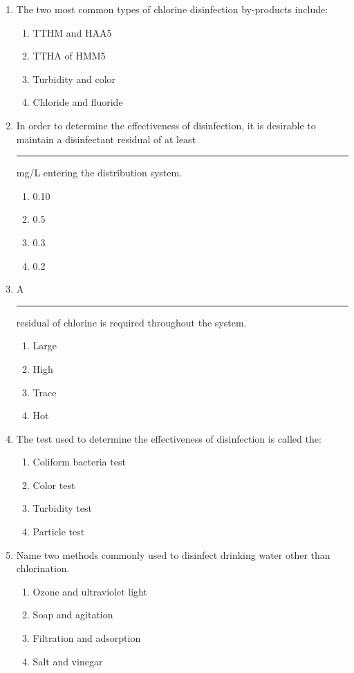 \begin{enumerate}
\item The two most common types of chlorine disinfection by-products include:
\begin{enumerate}
\item TTHM and HAA5
\item TTHA of HMM5
\item Turbidity and color
\item Chloride and fluoride
\end{enumerate}

\item In order to determine the effectiveness of disinfection, it is desirable to maintain a disinfectant residual of at least \rule{1cm}{0.5pt}  mg/L entering the distribution system.
\begin{enumerate}
\item 0.10
\item 0.5
\item 0.3
\item 0.2
\end{enumerate}

\item A \rule{1cm}{0.5pt}  residual of chlorine is required throughout the system.
\begin{enumerate}
\item Large
\item High
\item Trace
\item Hot
\end{enumerate}

\item The test used to determine the effectiveness of disinfection is called the:
\begin{enumerate}
\item Coliform bacteria test
\item Color test
\item Turbidity test
\item Particle test
\end{enumerate}


\item Name two methods commonly used to disinfect drinking water other than chlorination.
\begin{enumerate}
\item Ozone and ultraviolet light
\item Soap and agitation
\item Filtration and adsorption
\item Salt and vinegar
\end{enumerate}


\end{enumerate}
